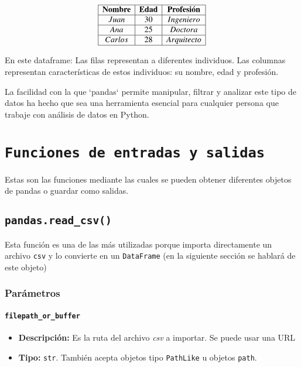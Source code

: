     \[
        \begin{array}{|c|c|c|}
            \hline
            \textbf{Nombre} & \textbf{Edad} & \textbf{Profesión} \\
            \hline
            Juan            & 30            & Ingeniero          \\
            \hline
            Ana             & 25            & Doctora            \\
            \hline
            Carlos          & 28            & Arquitecto         \\
            \hline
        \end{array}
    \]

    En este dataframe:
    Las filas representan a diferentes individuos.
    Las columnas representan características de estos individuos: su nombre, edad y profesión.

    La facilidad con la que `pandas` permite manipular, filtrar y analizar este tipo de datos ha hecho que sea una herramienta esencial para cualquier persona que trabaje con análisis de datos en Python.

    \section{\texttt{Funciones de entradas y salidas}}

        Estas son las funciones mediante las cuales se pueden obtener diferentes objetos de pandas o guardar como salidas.

        \subsection{\texttt{pandas.read\_csv()}}

        Esta función es una de las más utilizadas porque importa directamente un archivo \texttt{csv} y lo convierte en un \texttt{DataFrame} (en la siguiente sección se hablará de este objeto)

            \subsubsection{Parámetros}

                \paragraph{\texttt{filepath\_or\_buffer}}

                    \begin{itemize}
                        \item \textbf{Descripción:} Es la ruta del archivo \textit{csv} a importar. Se puede usar una URL
                        \item \textbf{Tipo:} \texttt{str}. También acepta objetos tipo \texttt{PathLike} u objetos \texttt{path}.
                    \end{itemize}

